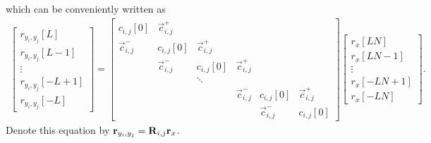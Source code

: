 \documentclass[a4paper, openany, oneside]{memoir}
\begin{document}
which can be conveniently written as
\begin{align*}
    \begin{bmatrix}
        r_{y_i,y_j}[L] \\
        r_{y_i,y_j}[L-1] \\
        \vdots \\
        r_{y_i,y_j}[-L+1] \\
        r_{y_i,y_j}[-L]
    \end{bmatrix} = \begin{bmatrix}
        c_{i,j}[0] & \vec{c}^+_{i,j} \\
        \vec{c}^{-}_{i,j} & c_{i,j}[0] & \vec{c}^{+}_{i,j} \\
        &\vec{c}^{-}_{i,j} & c_{i,j}[0] & \vec{c}^{+}_{i,j} \\
        &&\ddots \\
        &&&\vec{c}^{-}_{i,j} & c_{i,j}[0] & \vec{c}^{+}_{i,j} \\
        &&&&\vec{c}^{-}_{i,j} & c_{i,j}[0]
    \end{bmatrix} \begin{bmatrix}
        r_x[LN] \\
        r_x[LN-1] \\
        \vdots \\
        r_x[-LN+1] \\
        r_x[-LN]
    \end{bmatrix}.
\end{align*}
Denote this equation by $\boldsymbol{\mathbf{r}}_{y_i,y_j} = \boldsymbol{\mathbf{R}}_{i,j} \boldsymbol{\mathbf{r}}_x$.
\end{document}
